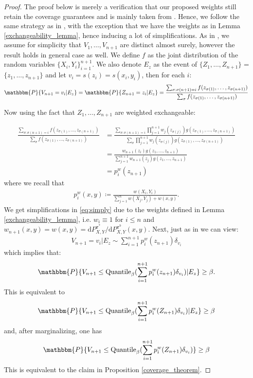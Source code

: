 \begin{proof}
The proof below is merely a verification that our proposed weights still retain the coverage guarantees and is mainly taken from \cite{tibshirani2020conformal}. Hence, we follow the same strategy as in \cite{tibshirani2020conformal}, with the exception that we have the weights as in Lemma \ref{exchangeability_lemma}, hence inducing a lot of simplifications. As in \cite{tibshirani2020conformal}, we assume for simplicity that $V_1, \dots, V_{n+1}$ are distinct almost surely, however the result holds in general case as well. We define $f$ as the joint distribution of the random variables $\{X_i, Y_i\}_{i=1}^{n+1}$. We also denote $E_z$ as the event of $\{Z_1, \dots, Z_{n+1}\}$ = $\{z_1, \dots, z_{n+1}\}$ and let $v_i = s(z_i) = s(x_i, y_i)$, then for each $i$:
\begin{align}
    \mathbbm{P}\{V_{n+1} = v_i| E_z\} = \mathbbm{P}\{Z_{n+1}=z_i|E_z\} = \frac{\sum_{\sigma:\sigma(n+1)=i}f(z_{\sigma(1)}, \dots, z_{\sigma(n+1)})}{\sum_{\sigma}f(z_{\sigma(1)}, \dots, z_{\sigma(n+1)})}
\end{align}

Now using the fact that $Z_1, \dots, Z_{n+1}$ are weighted exchangeable:

\begin{align}
    \frac{\sum_{\sigma:\sigma(n+1)=i}f(z_{\sigma(1)}, \dots, z_{\sigma(n+1)})}{\sum_{\sigma}f(z_{\sigma(1)}, \dots, z_{\sigma(n+1)})}&= \frac{\sum_{\sigma:\sigma(n+1)=i}\prod_{j=1}^{n+1}w_{j}(z_{\sigma(j)})g(z_{\sigma(1)}, \dots, z_{\sigma(n+1)})}{\sum_{\sigma}\prod_{j=1}^{n+1} w_{j}(z_{\sigma(j)})g(z_{\sigma(1)}, \dots, z_{\sigma(n+1)})}\label{eq:simply}\\ 
    &= \frac{w_{n+1}(z_i)g(z_{1}, \dots, z_{n+1})}{\sum_{j=1}^{n+1} w_{n+1}(z_{j})g(z_{1}, \dots, z_{n+1})}\nonumber\\
    &= p_i^w(z_{n+1}) \nonumber
\end{align}
where we recall that
\begin{align}
    p_i^{w}(x, y) \coloneqq \frac{w(X_i, Y_i)}{\sum_{j=1}^n w(X_j, Y_j) + w(x, y)}. \nonumber
\end{align}
We get simplifications in \eqref{eq:simply} due to the weights defined in Lemma \ref{exchangeability_lemma}, i.e. $w_i \equiv 1$ for $i \leq n$ and $w_{n+1}(x, y) = w(x, y) = \mathrm{d}P^{\pi^{*}}_{X,Y}/\mathrm{d}P^{\pi^{b}}_{X,Y}(x,y)$.
Next, just as in \cite{tibshirani2020conformal} we can view:
\begin{align}
    V_{n+1} = v_i| E_z \sim \sum_{i=1}^{n+1}p_i^w(z_{n+1}) \delta_{v_i}
\end{align}
which implies that:
$$
\mathbbm{P}\{V_{n+1} \leq \text{Quantile}_{\beta}(\sum_{i=1}^{n+1}p_i^w(z_{n+1}) \delta_{v_i}) | E_z\} \geq \beta.
$$
This is equivalent to 
$$
\mathbbm{P}\{V_{n+1} \leq \text{Quantile}_{\beta}(\sum_{i=1}^{n+1}p_i^w(Z_{n+1}) \delta_{v_i}) | E_z\} \geq \beta
$$
and, after marginalizing, one has
$$
\mathbbm{P}\{V_{n+1} \leq \text{Quantile}_{\beta}(\sum_{i=1}^{n+1}p_i^w(Z_{n+1}) \delta_{v_i})\} \geq \beta
$$
This is equivalent to the claim in Proposition \ref{coverage_theorem}.
\end{proof}

